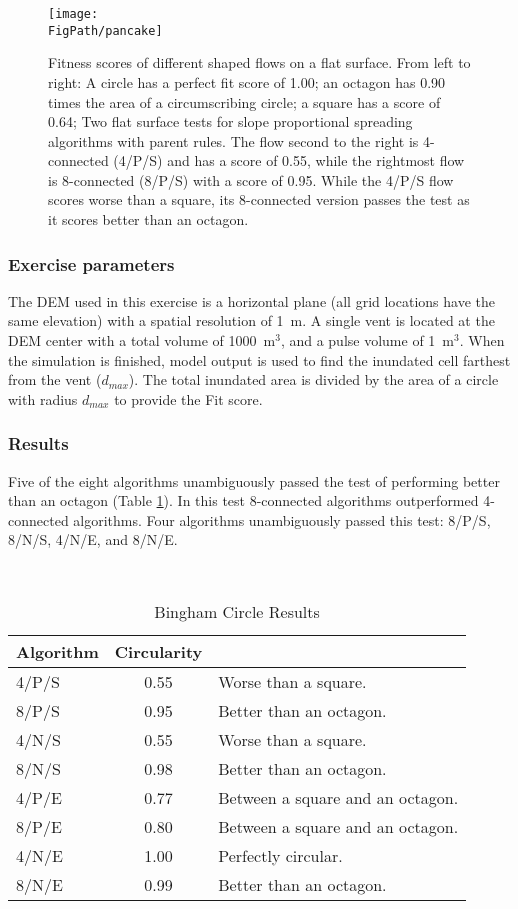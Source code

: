 		\begin{figure}[!h]
		\centering
		\texttt{[image: \\FigPath/pancake]}
		\caption[Fitness scores of different shaped flows on a flat surface]{Fitness scores of different shaped flows on a flat surface. From left to right: A circle has a perfect fit score of 1.00; an octagon has 0.90 times the area of a circumscribing circle; a square has a score of 0.64; Two flat surface tests for slope proportional spreading algorithms with parent rules. The flow second to the right is 4-connected (4/P/S) and has a score of 0.55, while the rightmost flow is 8-connected (8/P/S) with a score of 0.95. While the 4/P/S flow scores worse than a square, its 8-connected version passes the test as it scores better than an octagon.}
		\label{fig_pancake}
	\end{figure}
	
		\subsubsection{Exercise parameters} The DEM used in this exercise is a horizontal plane (all grid locations have the same elevation) with a spatial resolution of 1~m. A single vent is located at the DEM center with a total volume of 1000~m$^3$, and a pulse volume of 1~m$^3$. When the simulation is finished, model output is used to find the inundated cell farthest from the vent ($d_{max}$). The total inundated area is divided by the area of a circle with radius $d_{max}$ to provide the Fit score.
		
		\subsubsection{Results}

		Five of the eight algorithms unambiguously passed the test of performing better than an octagon (Table \ref{tab_circresults}). In this test 8-connected algorithms outperformed 4-connected algorithms. Four algorithms unambiguously passed this test: 8/P/S, 8/N/S, 4/N/E, and 8/N/E.
		
		\begin{table}[h]
			\centering
			\caption{Bingham Circle Results}\\
			\begin{tabular}{l c l}
				\toprule
				Algorithm&Circularity&\\
				\midrule
				4/P/S & 0.55 & Worse than a square.\\
				8/P/S & 0.95 & Better than an octagon.\\
				4/N/S & 0.55 & Worse than a square.\\
				8/N/S & 0.98 & Better than an octagon.\\
				4/P/E & 0.77 & Between a square and an octagon.\\
				8/P/E & 0.80 & Between a square and an octagon.\\
				4/N/E & 1.00 & Perfectly circular.\\
				8/N/E & 0.99 & Better than an octagon.\\
				\bottomrule
			\end{tabular}
			\label{tab_circresults}
		\end{table}
		
